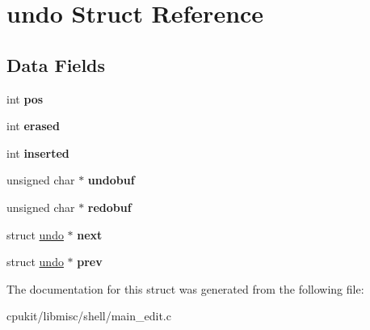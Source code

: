 \hypertarget{structundo}{}\section{undo Struct Reference}
\label{structundo}
\subsection*{Data Fields}
\begin{DoxyCompactItemize}
\item 
\mbox{\label{structundo_af80d21553edc510b270909d221424497}} 
int {\bfseries pos}
\item 
\mbox{\label{structundo_a9ed3f743103945ff4ef7ea0b8d9f98f5}} 
int {\bfseries erased}
\item 
\mbox{\label{structundo_a1794bd70f5bd9ce5b84d38e7a742959b}} 
int {\bfseries inserted}
\item 
\mbox{\label{structundo_a5d4002507ecf5aaeb4382078a329c973}} 
unsigned char $\ast$ {\bfseries undobuf}
\item 
\mbox{\label{structundo_accb01d341f6bbbb8e91a3a3a45f94884}} 
unsigned char $\ast$ {\bfseries redobuf}
\item 
\mbox{\label{structundo_a0a68010f763a0c7c0fe7e4727f436be2}} 
struct \mbox{\hyperlink{structundo}{undo}} $\ast$ {\bfseries next}
\item 
\mbox{\label{structundo_a2f6a3ef826772baa9fa3d5069c7b4723}} 
struct \mbox{\hyperlink{structundo}{undo}} $\ast$ {\bfseries prev}
\end{DoxyCompactItemize}


The documentation for this struct was generated from the following file\+:\begin{DoxyCompactItemize}
\item 
cpukit/libmisc/shell/main\+\_\+edit.\+c\end{DoxyCompactItemize}
